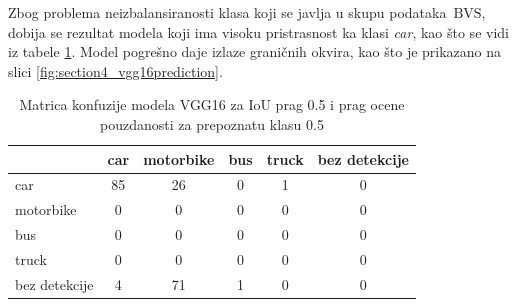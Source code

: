 \documentclass[12pt,oneside]{memoir}
\newcommand{\bvs}{\ensuremath{\,\textrm{BVS}}}
\begin{document}
Zbog problema neizbalansiranosti klasa koji se javlja u skupu podataka \bvs, dobija se rezultat modela koji ima visoku pristrasnost ka klasi \textit{car}, kao što se vidi iz tabele \ref{tab:section4_vgg16_confusionmatrix}. Model pogrešno daje izlaze graničnih okvira, kao što je prikazano na slici \ref{fig:section4_vgg16prediction}.

\begin{table}[h!]
    \begin{center}
    \caption{Matrica konfuzije modela VGG16 za IoU prag 0.5 i prag ocene pouzdanosti za prepoznatu klasu 0.5}
    \begin{tabular}{ l|c|c|c|c|c|}
                  & car  & motorbike & bus & truck & bez detekcije \\ \hline
    car           & 85   & 26        & 0   & 1     & 0             \\ 
    motorbike     & 0    & 0         & 0   & 0     & 0             \\ 
    bus           & 0    & 0         & 0   & 0     & 0             \\ 
    truck         & 0    & 0         & 0   & 0     & 0             \\ 
    bez detekcije & 4    & 71        & 1   & 0     & 0             \\ \hline
    \hline
    \end{tabular}
    \label{tab:section4_vgg16_confusionmatrix}
    \end{center}
\end{table}
\end{document}
